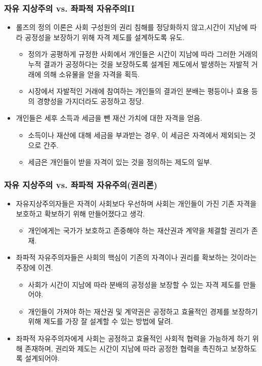 \documentclass[aspectratio=169,xcolor=dvipsnames,handout]{beamer}
\begin{document}
\begin{frame}[<+->]
\frametitle{자유 지상주의 vs. 좌파적 자유주의II}
    \begin{itemize}
        \item 롤즈의 정의 이론은 사회 구성원의 권리 침해를 정당화하지 않고,시간이 지남에 따라 공정성을 보장하기 위해 자격 제도를 설계하도록 유도.
        \begin{itemize}
            \item 정의가 공평하게 규정한 사회에서 개인들은 시간이 지남에 따라 그러한 거래의 누적 결과가 공정하다는 것을 보장하도록 설계된 제도에서 발생하는 자발적 거래에 의해 소유물을 얻을 자격을 획득.
            \item 시장에서 자발적인 거래에 참여하는 개인들의 결과인 분배는 평등이나 효용 등의 경향성을 가지더라도 공정하고 정당.
        \end{itemize}
        \item 개인들은 세후 소득과 세금을 뺀 재산 가치에 대한 자격을 얻음.
        \begin{itemize}
            \item 소득이나 재산에 대해 세금을 부과받는 경우, 이 세금은 자격에서 제외되는 것으로 간주.
            \item 세금은 개인들이 받을 자격이 있는 것을 정의하는 제도의 일부.
        \end{itemize}
    \end{itemize}
\end{frame}

\begin{frame}[<+->]
\frametitle{자유 지상주의 vs. 좌파적 자유주의(권리론)}
    \begin{itemize}
        \item 자유지상주의자들은 자격이 사회보다 우선하며 사회는 개인들이 가진 기존 자격을 보호하고 확보하기 위해 만들어졌다고 생각.
        \begin{itemize}
             \item 개인에게는 국가가 보호하고 존중해야 하는 재산권과 계약을 체결할 권리가 존재.
        \end{itemize}
        \item 좌파적 자유주의자들은 사회의 핵심이 기존의 자격이나 권리를 확보하는 것이라는 주장에 이견.
        \begin{itemize}
            \item 사회가 시간이 지남에 따라 분배의 공정성을 보장할 수 있는 자격 제도를 만들어야.
            \item 개인들이 가져야 하는 재산권 및 계약권은 공정하고 효율적인 경제를 보장하기 위해 제도를 가장 잘 설계할 수 있는 방법에 달려.
        \end{itemize}
        \item 좌파적 자유주의자에게 사회는 공정하고 효율적인 사회적 협력을 가능하게 하기 위해 존재하며, 권리와 제도는 시간이 지남에 따라 공정한 협력을 촉진하고 보장하도록 설계되어야.
    \end{itemize}
\end{frame}
\end{document}
